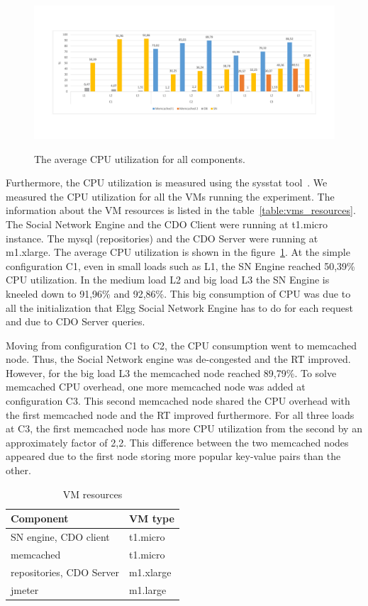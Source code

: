 \begin{figure}[h]
	\caption{The average CPU utilization for all components.}
	\includegraphics[width=1\textwidth,natwidth=200,natheight=150]{./fig/UsageAVG.pdf}
	\centering
	\label{fig:cpuavg}
\end{figure}

Furthermore, the CPU utilization is measured using the sysstat tool~\cite{sysstat_url}. We measured the CPU utilization for all the VMs running the experiment. The information about the VM resources is listed in the table~\ref{table:vms_resources}. The Social Network Engine and the CDO Client were running at t1.micro instance. The mysql (repositories) and the CDO Server were running at m1.xlarge. The average CPU utilization is shown in the figure~\ref{fig:cpuavg}. At the simple configuration C1, even in small loads such as L1, the SN Engine reached 50,39\% CPU utilization. In the medium load L2 and big load L3 the SN Engine is kneeled down to 91,96\% and 92,86\%. This big consumption of CPU was due to all the initialization that Elgg Social Network Engine has to do for each request and due to CDO Server queries.

Moving from configuration C1 to C2, the CPU consumption went to memcached node. Thus, the Social Network engine was de-congested and the RT improved. However, for the big load L3 the memcached node reached 89,79\%. To solve memcached CPU overhead, one more memcached node was added at configuration C3. This second memcached node shared the CPU overhead with the first memcached node and the RT improved furthermore. For all three loads at C3, the first memcached node has more CPU utilization from the second by an approximately factor of 2,2. This difference between the two memcached nodes appeared due to the first node storing more popular key-value pairs than the other.

\begin{table}[]
\label{table:vms_resources}
\centering
\caption{VM resources}
\label{my-label}
\begin{tabular}{|l|l|}
\hline
 Component &  VM type \\ \hline
 SN engine, CDO client &  t1.micro \\ \hline
 memcached &  t1.micro \\ \hline
 repositories, CDO Server &  m1.xlarge \\ \hline
 jmeter &  m1.large \\ \hline
\end{tabular}
\end{table}


